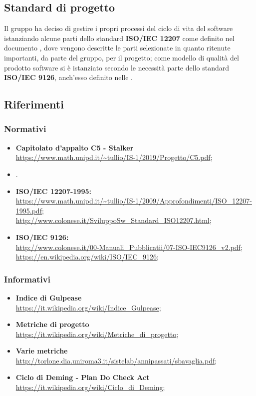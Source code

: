 \subsection{Standard di progetto}
Il gruppo \Gruppo{} ha deciso di gestire i propri processi del ciclo di vita del software istanziando alcune parti dello standard \textbf{ISO/IEC 12207} come definito nel documento \NdP{}, dove vengono descritte le parti selezionate in quanto ritenute importanti, da parte del gruppo, per il progetto; 
come modello di qualità del prodotto software si è istanziato secondo le necessità parte dello standard \textbf{ISO/IEC 9126}, anch'esso definito nelle \NdP{}.

\subsection{Riferimenti}

\subsubsection{Normativi}
\begin{itemize}
    \item \textbf{Capitolato d'appalto C5 - Stalker}\\     
    \url{https://www.math.unipd.it/~tullio/IS-1/2019/Progetto/C5.pdf};
    \item {}.
    \item \textbf{ISO/IEC 12207-1995:}\\     
    \url{https://www.math.unipd.it/~tullio/IS-1/2009/Approfondimenti/ISO_12207-1995.pdf};\\
    \url{http://www.colonese.it/SviluppoSw_Standard_ISO12207.html};
    \item \textbf{ISO/IEC 9126:}\\
    \url{http://www.colonese.it/00-Manuali_Pubblicatii/07-ISO-IEC9126_v2.pdf};\\
    \url{https://en.wikipedia.org/wiki/ISO/IEC_9126};
\end{itemize}

\subsubsection{Informativi}
\begin{itemize}
    \item \textbf{Indice di Gulpease}\\
    \url{https://it.wikipedia.org/wiki/Indice_Gulpease};
    \item \textbf{Metriche di progetto}\\
    \url{https://it.wikipedia.org/wiki/Metriche_di_progetto};
    \item \textbf{Varie metriche}\\
    \url{http://torlone.dia.uniroma3.it/sistelab/annipassati/sbavaglia.pdf};
    \item \textbf{Ciclo di Deming - Plan Do Check Act}\\
    \url{https://it.wikipedia.org/wiki/Ciclo_di_Deming};
\end{itemize}
